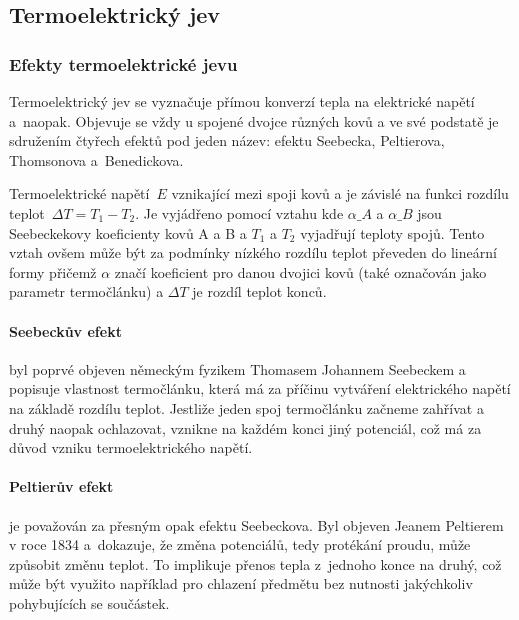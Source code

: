 \subsection{Termoelektrický jev}
\subsubsection{Efekty termoelektrické jevu}
Termoelektrický jev se vyznačuje přímou konverzí tepla na elektrické napětí
a~naopak. Objevuje se vždy u spojené dvojce různých kovů a ve své podstatě je
sdružením čtyřech efektů pod jeden název: efektu Seebecka, Peltierova, Thomsonova
a~Benedickova.~\cite{praktikum,diplomka}

Termoelektrické napětí~$E$ vznikající mezi spoji kovů a je závislé na funkci
rozdílu teplot~$\Delta T = T_1 - T_2$. Je vyjádřeno pomocí vztahu
kde $\alpha\_A$ a $\alpha\_B$ jsou Seebeckekovy koeficienty kovů A a B a $T_1$
a $T_2$ vyjadřují teploty spojů.  Tento vztah ovšem může být za podmínky
nízkého rozdílu teplot převeden do lineární formy
přičemž $\alpha$ značí koeficient pro danou dvojici kovů (také označován jako
parametr termočlánku) a $\Delta T$ je rozdíl teplot konců.~\cite{diplomka}

\paragraph{Seebeckův efekt} byl poprvé objeven německým fyzikem Thomasem
Johannem Seebeckem a popisuje vlastnost termočlánku, která má za příčinu
vytváření elektrického napětí na základě rozdílu teplot. Jestliže jeden spoj
termočlánku začneme zahřívat a druhý naopak ochlazovat, vznikne na každém konci
jiný potenciál, což má za důvod vzniku termoelektrického
napětí.~\cite{jreichl-seebeck}

\paragraph{Peltierův efekt} je považován za přesným opak efektu Seebeckova. Byl
objeven Jeanem Peltierem v roce 1834 a~dokazuje, že změna potenciálů, tedy
protékání proudu, může způsobit změnu teplot. To implikuje přenos tepla
z~jednoho konce na druhý, což může být využito například pro chlazení předmětu
bez nutnosti jakýchkoliv pohybujících se součástek.~\cite{peltier}

